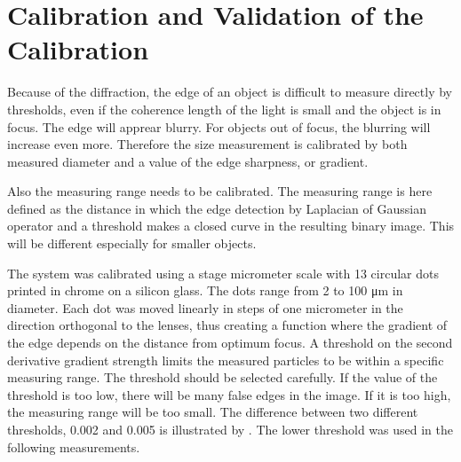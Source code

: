 %
%


\section{Calibration and Validation of the Calibration}

Because of the diffraction, the edge of an object is difficult to measure directly by thresholds, even if the coherence length of the light is small and the object is in focus. The edge will apprear blurry. For objects out of focus, the blurring will increase even more. Therefore the size measurement is calibrated by both measured diameter and a value of the edge sharpness, or gradient.

Also the measuring range needs to be calibrated. The measuring range is here defined as the distance in which the edge detection by Laplacian of Gaussian operator and a threshold makes a closed curve in the resulting binary image. This will be different especially for smaller objects.

The system was calibrated using a stage micrometer scale with 13 circular dots printed in chrome on a silicon glass. The dots range from 2 to 100 μm in diameter. Each dot was moved linearly in steps of one micrometer in the direction orthogonal to the lenses, thus creating a function where the gradient of the edge depends on the distance from optimum focus. A threshold on the second derivative gradient strength limits the measured particles to be within a specific measuring range. The threshold should be selected carefully. If the value of the threshold is too low, there will be many false edges in the image. If it is too high, the measuring range will be too small. The difference between two different thresholds, 0.002 and 0.005 is illustrated by . The lower threshold was used in the following measurements.


